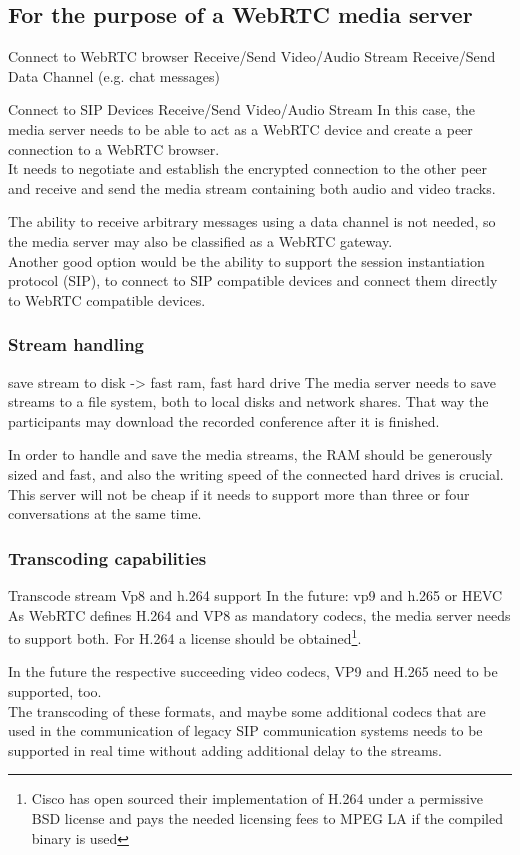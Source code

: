 \documentclass[../../../thesis.tex]{subfiles}
\begin{document}
\subsection{For the purpose of a WebRTC media server}
\comment
Connect to WebRTC browser
	Receive/Send Video/Audio Stream
	Receive/Send Data Channel (e.g. chat messages)

Connect to SIP Devices
	Receive/Send Video/Audio Stream
\endcomment
In this case, the media server needs to be able to act as a WebRTC device and create a peer connection to a WebRTC browser. \\
It needs to negotiate and establish the encrypted connection to the other peer and receive and send the media stream containing both audio and video tracks.\par
The ability to receive arbitrary messages using a data channel is not needed, so the media server may also be classified as a WebRTC gateway.\\

Another good option would be the ability to support the session instantiation protocol (SIP), to connect to SIP compatible devices and connect them directly to WebRTC compatible devices.

\subsubsection{Stream handling}
\comment
save stream to disk -> fast ram, fast hard drive
\endcomment
The media server needs to save streams to a file system, both to local disks and network shares. That way the participants may download the recorded conference after it is finished.\par
In order to handle and save the media streams, the RAM should be generously sized and fast, and also the writing speed of the connected hard drives is crucial. This server will not be cheap if it needs to support more than three or four conversations at the same time.\\

\subsubsection{Transcoding capabilities}
\comment
Transcode stream
	Vp8 and h.264 support
	In the future: vp9 and h.265 or HEVC
\endcomment
As WebRTC defines H.264 and VP8 as mandatory codecs\cite{ietf-rtcweb-video}, the media server needs to support both. For H.264 a license should be obtained\footnote{Cisco has open sourced their implementation of H.264 under a permissive BSD license and pays the needed licensing fees to MPEG LA if the compiled binary is used\cite{open-h264}}.\par
In the future the respective succeeding video codecs, VP9 and H.265 need to be supported, too.\\
The transcoding of these formats, and maybe some additional codecs that are used in the communication of legacy SIP communication systems needs to be supported in real time without adding additional delay to the streams.
\end{document}
